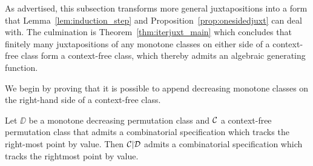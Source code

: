 \documentclass[12pt, a4paper, twoside]{report}
\begin{document}
As advertised, this subsection transforms more general juxtapositions into a form that Lemma~\ref{lem:induction_step} and Proposition~\ref{prop:onesidedjuxt} can deal with. The culmination is Theorem~\ref{thm:iterjuxt_main} which concludes that finitely many juxtapositions of any monotone classes on either side of a context-free class form a context-free class, which thereby admits an algebraic generating function.

We begin by proving that it is possible to append decreasing monotone classes on the right-hand side of a context-free class.
\begin{proposition}
  \label{prop:decrappend}
  Let $\DD$ be a monotone decreasing permutation class and $\mathcal{C}$ a context-free permutation class that admits a combinatorial specification which tracks the right-most point by value. Then $\mathcal{C}|\mathcal{D}$ admits a combinatorial specification which tracks the rightmost point by value.
\end{proposition}
\end{document}
